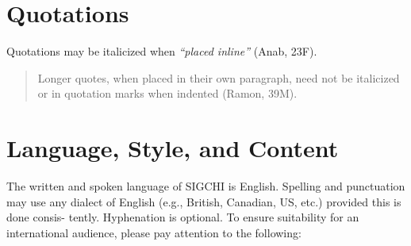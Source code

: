 \documentclass{sigchi}
\begin{document}
\section{Quotations}
Quotations may be italicized when \textit{``placed inline''} (Anab,
23F).

\begin{quote}
Longer quotes, when placed in their own paragraph, need not be
italicized or in quotation marks when indented (Ramon, 39M).  
\end{quote}

\section{Language, Style, and Content}

The written and spoken language of SIGCHI is English. Spelling and
punctuation may use any dialect of English (e.g., British, Canadian,
US, etc.) provided this is done consis- tently. Hyphenation is
optional. To ensure suitability for an international audience, please
pay attention to the following:
\end{document}
